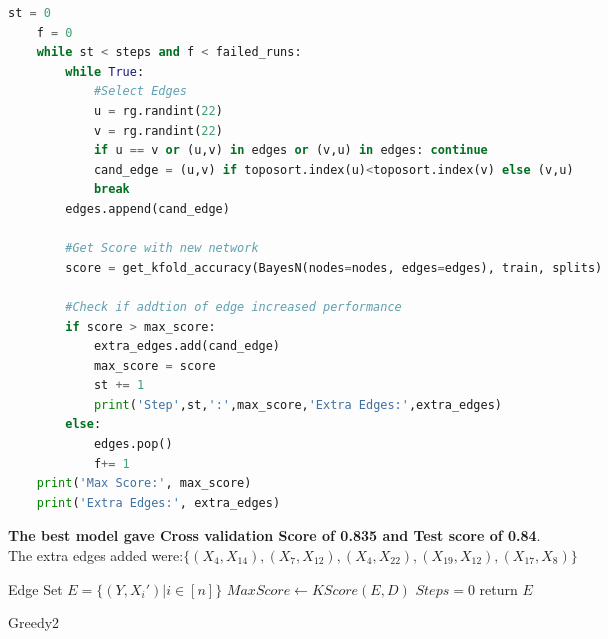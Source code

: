 \documentclass[addpoints,11pt,a4paper]{exam}
\begin{document}
\begin{questions}
\begin{parts}
\begin{solution}
\begin{lstlisting}[language=Python, style=mystyle]
    st = 0
    f = 0
    while st < steps and f < failed_runs:
        while True:
            #Select Edges
            u = rg.randint(22)
            v = rg.randint(22)
            if u == v or (u,v) in edges or (v,u) in edges: continue
            cand_edge = (u,v) if toposort.index(u)<toposort.index(v) else (v,u)
            break
        edges.append(cand_edge)
        
        #Get Score with new network
        score = get_kfold_accuracy(BayesN(nodes=nodes, edges=edges), train, splits)

        #Check if addtion of edge increased performance
        if score > max_score:
            extra_edges.add(cand_edge)
            max_score = score
            st += 1
            print('Step',st,':',max_score,'Extra Edges:',extra_edges)
        else:
            edges.pop()
            f+= 1
    print('Max Score:', max_score)
    print('Extra Edges:', extra_edges)
\end{lstlisting}

\textbf{The best model gave Cross validation Score of 0.835 and Test score of 0.84}.\\
The extra edges added were:$\{(X_4, X_{14}), (X_7, X_{12}), (X_4, X_{22}), (X_{19}, X_{12}), (X_{17}, X_{8})\}$

\newpage

\begin{algorithm}[H]

\SetAlgoLined
{}
Edge Set $E=\{(Y,X_i')|i\in [n]\}$\;
$MaxScore\leftarrow KScore(E,D)$\;
$Steps=0$\;
return $E$\;

\caption{Greedy2}
\end{algorithm}


\end{solution}
\end{parts}
\end{questions}
\end{document}

